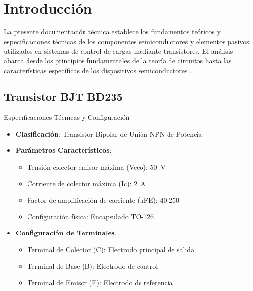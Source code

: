 \section{Introducción}
La presente documentación técnica establece los fundamentos teóricos y especificaciones técnicas de los componentes semiconductores y elementos pasivos utilizados en sistemas de control de cargas mediante transistores. El análisis abarca desde los principios fundamentales de la teoría de circuitos hasta las características específicas de los dispositivos semiconductores \citep{malvino2021electronic}.

\subsection{Transistor BJT BD235}
\begin{componentBox}{Especificaciones Técnicas y Configuración \citep{onsemi2021bd235}}
	\begin{itemize}[leftmargin=*,itemsep=1pt,parsep=1pt]
		\item \textbf{Clasificación}: Transistor Bipolar de Unión NPN de Potencia
		\item \textbf{Parámetros Característicos}:
		\begin{itemize}[itemsep=0pt,parsep=0pt]
			\item Tensión colector-emisor máxima (Vceo): \SI{50}{\volt}
			\item Corriente de colector máxima (Ic): \SI{2}{\ampere}
			\item Factor de amplificación de corriente (hFE): 40-250
			\item Configuración física: Encapsulado TO-126
		\end{itemize}
		\item \textbf{Configuración de Terminales}:
		\begin{itemize}[itemsep=0pt,parsep=0pt]
			\item Terminal de Colector (C): Electrodo principal de salida
			\item Terminal de Base (B): Electrodo de control
			\item Terminal de Emisor (E): Electrodo de referencia
		\end{itemize}
	\end{itemize}
\end{componentBox}

